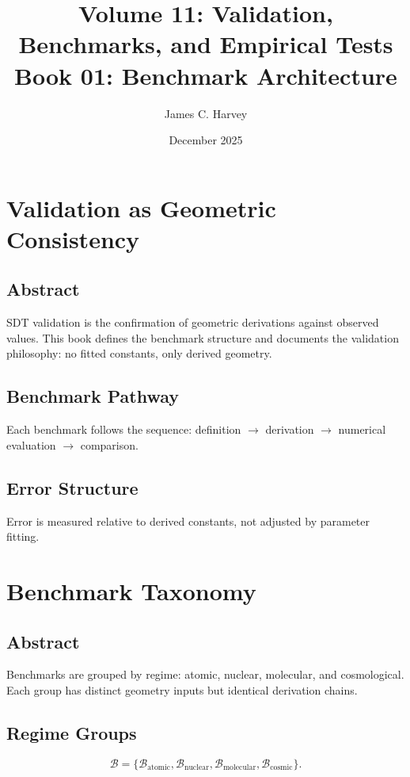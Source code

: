 \documentclass[12pt]{book}
\title{Volume 11: Validation, Benchmarks, and Empirical Tests \\ Book 01: Benchmark Architecture}
\author{James C. Harvey}
\date{December 2025}
\begin{document}
\maketitle
\tableofcontents

\chapter{Validation as Geometric Consistency}

\section*{Abstract}
SDT validation is the confirmation of geometric derivations against observed values. This book defines
the benchmark structure and documents the validation philosophy: no fitted constants, only derived
geometry.

\section{Benchmark Pathway}
Each benchmark follows the sequence: definition $\rightarrow$ derivation $\rightarrow$ numerical
evaluation $\rightarrow$ comparison.

\section{Error Structure}
Error is measured relative to derived constants, not adjusted by parameter fitting.

\chapter{Benchmark Taxonomy}

\section*{Abstract}
Benchmarks are grouped by regime: atomic, nuclear, molecular, and cosmological. Each group has distinct
geometry inputs but identical derivation chains.

\section{Regime Groups}
\begin{equation}
\mathcal{B} = \{\mathcal{B}_{\text{atomic}}, \mathcal{B}_{\text{nuclear}}, \mathcal{B}_{\text{molecular}}, \mathcal{B}_{\text{cosmic}}\}.
\end{equation}
\end{document}
